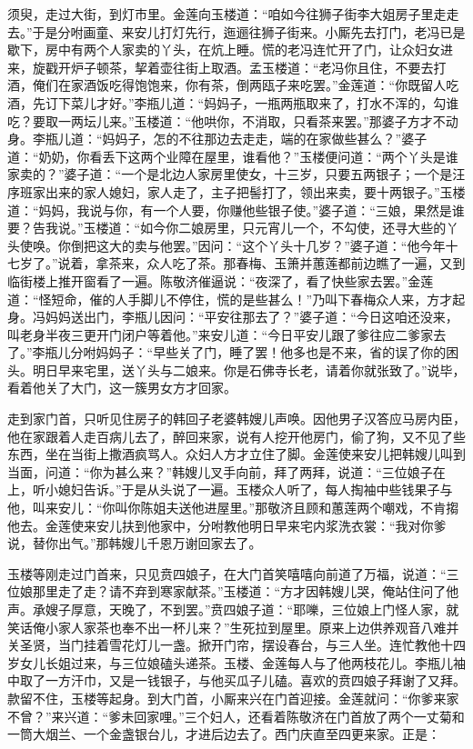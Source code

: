 须臾，走过大街，到灯市里。金莲向玉楼道：“咱如今往狮子街李大姐房子里走走去。”于是分咐画童、来安儿打灯先行，迤逦往狮子街来。小厮先去打门，老冯已是歇下，房中有两个人家卖的丫头，在炕上睡。慌的老冯连忙开了门，让众妇女进来，旋戳开炉子顿茶，挈着壶往街上取酒。孟玉楼道：“老冯你且住，不要去打酒，俺们在家酒饭吃得饱饱来，你有茶，倒两瓯子来吃罢。”金莲道：“你既留人吃酒，先订下菜儿才好。”李瓶儿道：“妈妈子，一瓶两瓶取来了，打水不浑的，勾谁吃？要取一两坛儿来。”玉楼道：“他哄你，不消取，只看茶来罢。”那婆子方才不动身。李瓶儿道：“妈妈子，怎的不往那边去走走，端的在家做些甚么？”婆子道：“奶奶，你看丢下这两个业障在屋里，谁看他？”玉楼便问道：“两个丫头是谁家卖的？”婆子道：“一个是北边人家房里使女，十三岁，只要五两银子；一个是汪序班家出来的家人媳妇，家人走了，主子把髻打了，领出来卖，要十两银子。”玉楼道：“妈妈，我说与你，有一个人要，你赚他些银子使。”婆子道：“三娘，果然是谁要？告我说。”玉楼道：“如今你二娘房里，只元宵儿一个，不勾使，还寻大些的丫头使唤。你倒把这大的卖与他罢。”因问：“这个丫头十几岁？”婆子道：“他今年十七岁了。”说着，拿茶来，众人吃了茶。那春梅、玉箫并蕙莲都前边瞧了一遍，又到临街楼上推开窗看了一遍。陈敬济催逼说：“夜深了，看了快些家去罢。”金莲道：“怪短命，催的人手脚儿不停住，慌的是些甚么！”乃叫下春梅众人来，方才起身。冯妈妈送出门，李瓶儿因问：“平安往那去了？”婆子道：“今日这咱还没来，叫老身半夜三更开门闭户等着他。”来安儿道：“今日平安儿跟了爹往应二爹家去了。”李瓶儿分咐妈妈子：“早些关了门，睡了罢！他多也是不来，省的误了你的困头。明日早来宅里，送丫头与二娘来。你是石佛寺长老，请着你就张致了。”说毕，看着他关了大门，这一簇男女方才回家。

走到家门首，只听见住房子的韩回子老婆韩嫂儿声唤。因他男子汉答应马房内臣，他在家跟着人走百病儿去了，醉回来家，说有人挖开他房门，偷了狗，又不见了些东西，坐在当街上撒酒疯骂人。众妇人方才立住了脚。金莲使来安儿把韩嫂儿叫到当面，问道：“你为甚么来？”韩嫂儿叉手向前，拜了两拜，说道：“三位娘子在上，听小媳妇告诉。”于是从头说了一遍。玉楼众人听了，每人掏袖中些钱果子与他，叫来安儿：“你叫你陈姐夫送他进屋里。”那敬济且顾和蕙莲两个嘲戏，不肯搊他去。金莲使来安儿扶到他家中，分咐教他明日早来宅内浆洗衣裳：“我对你爹说，替你出气。”那韩嫂儿千恩万谢回家去了。

玉楼等刚走过门首来，只见贲四娘子，在大门首笑嘻嘻向前道了万福，说道：“三位娘那里走了走？请不弃到寒家献茶。”玉楼道：“方才因韩嫂儿哭，俺站住问了他声。承嫂子厚意，天晚了，不到罢。”贲四娘子道：“耶嚛，三位娘上门怪人家，就笑话俺小家人家茶也奉不出一杯儿来？”生死拉到屋里。原来上边供养观音八难并关圣贤，当门挂着雪花灯儿一盏。掀开门帘，摆设春台，与三人坐。连忙教他十四岁女儿长姐过来，与三位娘磕头递茶。玉楼、金莲每人与了他两枝花儿。李瓶儿袖中取了一方汗巾，又是一钱银子，与他买瓜子儿磕。喜欢的贲四娘子拜谢了又拜。款留不住，玉楼等起身。到大门首，小厮来兴在门首迎接。金莲就问：“你爹来家不曾？”来兴道：“爹未回家哩。”三个妇人，还看着陈敬济在门首放了两个一丈菊和一筒大烟兰、一个金盏银台儿，才进后边去了。西门庆直至四更来家。正是：


